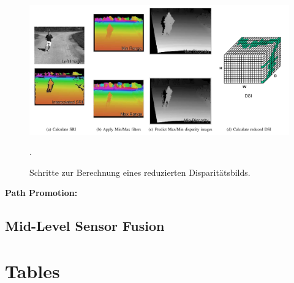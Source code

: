 \documentclass[10pt]{article}
\begin{document}
\begin{figure}[ht]\centering%
	\includegraphics[width=15cm]{images/png/badino_dsi_computation.png}
	\caption[Reduziertes Disparitätsbild]{ Schritte zur Berechnung eines reduzierten Disparitätsbilds. \cite{Badino2011a} }.
	\label{img:badino_interpolation}
\end{figure}



\textbf{Path Promotion:}
\subsection*{Mid-Level Sensor Fusion}








\section*{Tables}
\end{document}
